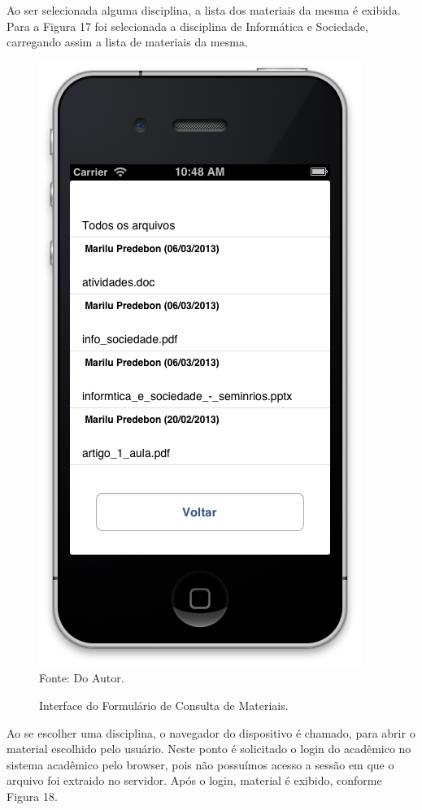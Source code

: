 Ao ser selecionada alguma disciplina, a lista dos materiais da mesma é exibida. Para a Figura 17 foi selecionada a disciplina de Informática e Sociedade, carregando assim a lista de materiais da mesma.

\begin{figure}[!htb]
     \centering
     \caption[Formulário Material de Apoio - Consulta de Materiais]{Interface do Formulário de Consulta de Materiais.}
     \includegraphics[scale=0.5]{imagens/formmaterialdisciplina.png}
     \\  Fonte: Do Autor.
\end{figure}
\newpage

Ao se escolher uma disciplina, o navegador do dispositivo é chamado, para abrir o material escolhido pelo usuário. Neste ponto é solicitado o login do acadêmico no sistema acadêmico pelo browser, pois não possuímos acesso a sessão em que o arquivo foi extraido no servidor. Após o login, material é exibido, conforme Figura 18.

